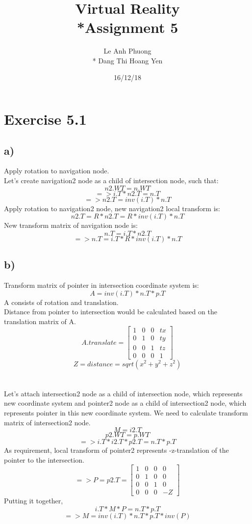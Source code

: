 \documentclass[12pt]{article}
\title{Virtual Reality\\*Assignment 5}
\author{Le Anh Phuong\\* Dang Thi Hoang Yen}
\date{16/12/18}
\begin{document}
\maketitle

\section*{Exercise 5.1}
\subsection*{a)}

Apply rotation to navigation node.\\
Let's create navigation2 node as a child of intersection node, such that:
$$n2.WT = n.WT $$
$$=> i.T * n2.T = n.T$$
$$=> n2.T = inv(i.T) * n.T
$$
Apply rotation to navigation2 node, new navigation2 local transform is:
$$n2.T = R * n2.T = R * inv(i.T) * n.T$$
New transform matrix of navigation node is:
$$n.T = i.T * n2.T$$
$$=>n.T = i.T * R * inv(i.T) * n.T$$
\subsection*{b)}

Transform matrix of pointer in intersection coordinate system is:
$$A = inv(i.T) * n.T * p.T$$
A consists of rotation and translation.\\
Distance from pointer to intersection would be calculated based on the translation matrix of A.\\
$$
A.translate=\begin{bmatrix}
    1 & 0 & 0 & tx \\
    0 & 1 & 0 & ty \\
    0 & 0 & 1 & tz \\
    0 & 0 & 0 & 1
  \end{bmatrix}
$$
$$Z = distance = sqrt(x^2 + y^2 + z^2)$$
\\\\Let's attach intersection2 node as a child of intersection node, which represents new coordinate system and pointer2 node as a child of intersection2 node, which represents pointer in this new coordinate system.
We need to calculate transform matrix of intersection2 node.
$$M = i2.T$$
$$p2.WT = p.WT$$
$$=> i.T * i2.T * p2.T = n.T * p.T$$
As requirement, local transform of pointer2 represents -z-translation of the pointer to the intersection.
$$=> P = p2.T = \begin{bmatrix}
    1 & 0 & 0 & 0 \\
    0 & 1 & 0 & 0 \\
    0 & 0 & 1 & 0 \\
    0 & 0 & 0 & -Z
  \end{bmatrix}$$
Putting it together,
$$i.T * M * P = n.T * p.T$$
$$=> M = inv(i.T) * n.T * p.T * inv(P)$$
\end{document}
